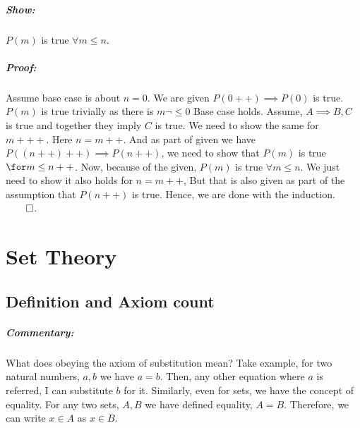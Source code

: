 \documentclass{report}
\begin{document}
\paragraph{Show: } $P(m)$ is true $\forall m \le n$.
\paragraph{Proof:} Assume base case is about $n=0$. We are given $P(0++) \implies P(0)$ is true. $P(m)$ is true trivially as there is  $m \neg \le0$ Base case holds. Assume,  $A \implies B, C$ is true and together they imply  $C$ is true. We need to show the same for $m+++$. Here $n=m++$. And as part of given we have  $P((n++)++) \implies P(n++)$, we need to show that  $P(m)$ is true $\for m \le n++$. Now, because of the given, $P(m)$ is true  $\forall m \le n$. We just need to show it also holds for  $n=m++$, But that is also given as part of the assumption that  $P(n++)$ is true. Hence, we are done with the induction. $\qed$. 







\chapter{Set Theory}
\section*{Definition and Axiom count}
\paragraph{Commentary: }What does obeying the axiom of substitution mean? Take example, for two natural numbers, $a,b$ we have $a=b$. Then, any other equation where $a$ is referred, I can substitute $b$ for it. Similarly, even for sets, we have the concept of equality. For any two sets,  $A,B$ we have defined equality, $A=B$. Therefore, we can write $x \in A$ as  $x \in B$.
\end{document}
